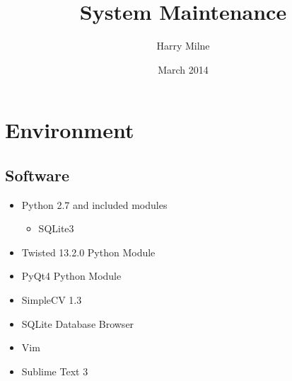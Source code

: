 \documentclass[a4paper]{article}
\title{System Maintenance}
\author{Harry Milne}
\date{March 2014}
\begin{document}
\maketitle
\tableofcontents


\section{Environment}
    \label{sec:env}
    \subsection{Software}
    \begin{itemize}
        \item Python 2.7 and included modules
        
        \begin{itemize}
            \item SQLite3
        \end{itemize}
        
        \item Twisted 13.2.0 Python Module
        \item PyQt4 Python Module
        \item SimpleCV 1.3
        \item SQLite Database Browser
        \item Vim
        \item Sublime Text 3
    \end{itemize}
\end{document}
